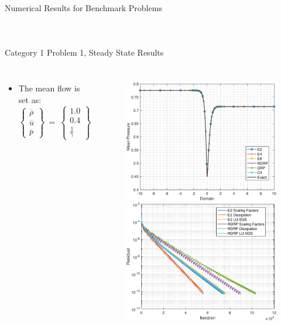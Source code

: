 \begin{frame}{Numerical Results for Benchmark
Problems}
\begin{columns}
\begin{figure}[hbt!]
            \label{fig:Euler_CD_Area}
        \end{figure}
    \end{columns}
\end{frame}

\begin{frame}{Category 1 Problem 1, Steady State Results}
    \begin{columns}
    \begin{itemize}
            \item The mean flow is set as:
\begin{equation*}
	\left\{
	\begin{matrix}
		\overline{\rho} \\
		\overline{u} \\
		\overline{p}
	\end{matrix}
	\right\}~=~
	\left\{
	\begin{matrix}
		1.0 \\
		0.4 \\
		\frac{1}{\gamma}
	\end{matrix}
	\right\}
\end{equation*}
	\end{itemize}
	
\begin{figure}
  \includegraphics[width=0.48\linewidth]{Figures/C1P1_SteadyState}%
  \includegraphics[width=0.48\linewidth]{Figures/C1P1_ROC_E2_vs_RDRP}
\end{figure}

    \end{columns}
\end{frame}

